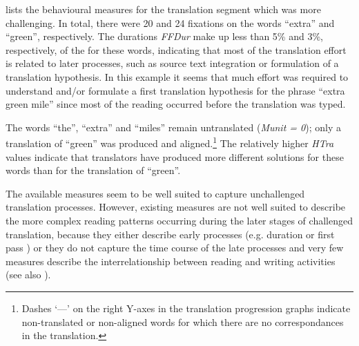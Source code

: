 \documentclass[output=paper]{LSP/langsci}
\begin{document}
 
\newpage  
{} lists the behavioural measures for the translation segment which was more challenging. In total, there were 20 and 24 fixations on the words ``extra'' and ``green'', respectively. The  durations \textit{FFDur} make up less than 5\% and 3\%, respectively, of the  for these words, indicating that most of the translation effort is related to later processes, such as source text integration or formulation of a translation hypothesis. In this example it seems that much effort was required to understand and/or formulate a first translation hypothesis for the phrase ``extra green mile'' since most of the reading occurred before the translation was typed.

\largerpage[-1] 
The words ``the'', ``extra'' and ``miles'' remain untranslated (\textit{Munit = 0}); only a  translation of ``green'' was produced and aligned.\footnote{Dashes `---' on the right Y-axes in the translation progression graphs indicate non-translated or non-aligned words for which there are no correspondances in the translation.} The relatively higher \textit{HTra} values indicate that translators have produced more different solutions for these words than for the translation of ``green''.

  
The available  measures seem to be well suited to capture unchallenged translation processes. However, existing measures are not well suited to describe the more complex reading patterns occurring during the later stages of challenged translation, because they either describe early processes (e.g.  duration or first pass ) or they do not capture the time course of the late processes and very few measures describe the interrelationship between reading and writing activities (see also \citealt{SchaefferCarl}).
\end{document}
